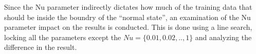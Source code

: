 Since the Nu parameter indirectly dictates how much of the training data that should be inside the boundry of the ``normal state'', an examination of the Nu parameter impact on the results is conducted.
This is done using a line search, locking all the parameters except the $Nu = \{0.01, 0.02,.., 1\}$ and analyzing the difference in the result. 

